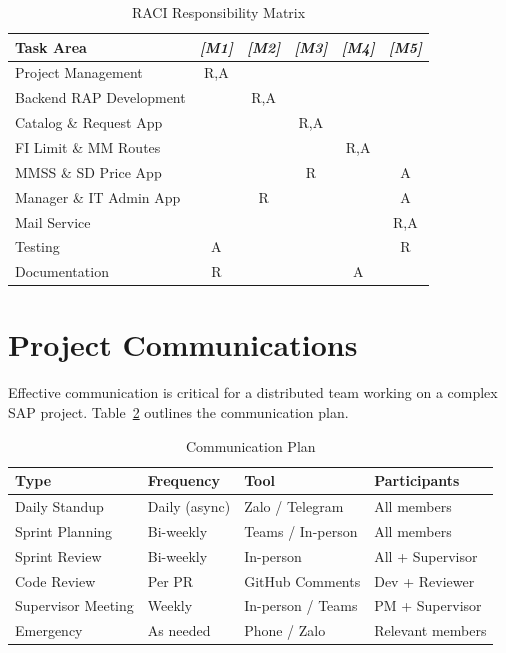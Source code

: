 \documentclass[12pt,a4paper]{report}
\newcommand{\placeholder}[1]{\textcolor{placeholderblue}{\textit{[#1]}}}
\begin{document}
\begin{table}[H]
\centering\small
\begin{tabularx}{\textwidth}{|X|c|c|c|c|c|}
  \hline
  \rowcolor{tableheadpeach}
  \textbf{Task Area} & \textbf{\placeholder{M1}} & \textbf{\placeholder{M2}} & \textbf{\placeholder{M3}} & \textbf{\placeholder{M4}} & \textbf{\placeholder{M5}} \\ \hline
  Project Management       & R,A &     &     &     &     \\ \hline
  Backend RAP Development  &     & R,A &     &     &     \\ \hline
  Catalog \& Request App   &     &     & R,A &     &     \\ \hline
  FI Limit \& MM Routes    &     &     &     & R,A &     \\ \hline
  MMSS \& SD Price App     &     &     & R   &     & A   \\ \hline
  Manager \& IT Admin App  &     & R   &     &     & A   \\ \hline
  Mail Service             &     &     &     &     & R,A \\ \hline
  Testing                  & A   &     &     &     & R   \\ \hline
  Documentation            & R   &     &     & A   &     \\ \hline
\end{tabularx}
\caption{RACI Responsibility Matrix}
\label{tab:raci}
\end{table}


\section{Project Communications}

Effective communication is critical for a distributed team working on a complex SAP project. Table~\ref{tab:communications} outlines the communication plan.

\begin{table}[H]
\centering\small
\begin{tabularx}{\textwidth}{|X|l|l|X|}
  \hline
  \rowcolor{tableheadpeach}
  \textbf{Type} & \textbf{Frequency} & \textbf{Tool} & \textbf{Participants} \\ \hline
  Daily Standup       & Daily (async)     & Zalo / Telegram   & All members \\ \hline
  Sprint Planning     & Bi-weekly         & Teams / In-person  & All members \\ \hline
  Sprint Review       & Bi-weekly         & In-person          & All + Supervisor \\ \hline
  Code Review         & Per PR            & GitHub Comments    & Dev + Reviewer \\ \hline
  Supervisor Meeting  & Weekly            & In-person / Teams  & PM + Supervisor \\ \hline
  Emergency           & As needed         & Phone / Zalo       & Relevant members \\ \hline
\end{tabularx}
\caption{Communication Plan}
\label{tab:communications}
\end{table}
\end{document}

